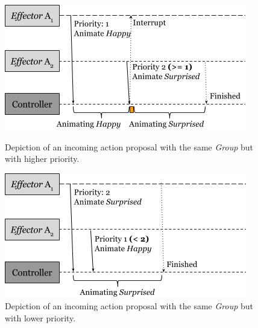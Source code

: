 \begin{figure}[H]
    \centering
    \begin{minipage}[b]{.4\textwidth}
        \centering
        \includegraphics[width=\textwidth]{images/ConflictingAndInterrupt.png}
        \caption{Depiction of an incoming action proposal with the same \textit{Group} but with higher priority.}
        
               
        \label{fig:conflict_interrupt}
    \end{minipage}
    \hspace{20mm}
    \begin{minipage}[b]{.4\textwidth}
        \centering
        \includegraphics[width=\textwidth]{images/ConflictingNotInterrupted.png}
        \caption{Depiction of an incoming action proposal with the same \textit{Group} but with lower priority.}
        \label{fig:conflicting_not_interrupted}
    \end{minipage}
\end{figure}


